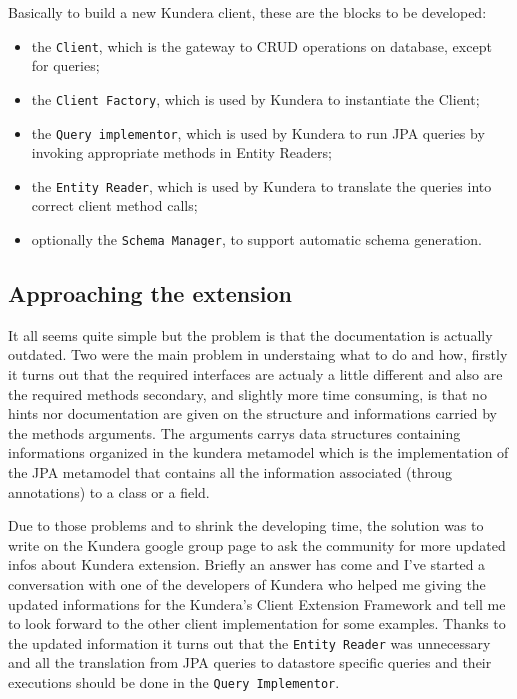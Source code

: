 \newparagraph Basically to build a new Kundera client, these are the blocks to be developed:
\begin{itemize}
\item the \texttt{Client}, which is the gateway to CRUD operations on database, except for queries;
\item the \texttt{Client Factory}, which is used by Kundera to instantiate the Client;
\item the \texttt{Query implementor}, which is used by Kundera to run JPA queries by invoking appropriate methods in Entity Readers;
\item the \texttt{Entity Reader}, which is used by Kundera to translate the queries into correct client
method calls;
\item optionally the \texttt{Schema Manager}, to support automatic schema generation.
\end{itemize}

\subsection{Approaching the extension}
It all seems quite simple but the problem is that the documentation is actually outdated. 
Two were the main problem in understaing what to do and how, firstly it turns out that the required interfaces are actualy a little different and also are the required methods
secondary, and slightly more time consuming, is that no hints nor documentation are given on the structure and informations carried by the methods arguments.
The arguments carrys data structures containing informations organized in the kundera metamodel which is the implementation of the JPA metamodel that contains all the information associated (throug annotations) to a class or a field.

\newparagraph Due to those problems and to shrink the developing time, the solution was to write on the Kundera google group page to ask the community for more updated infos about Kundera extension.
Briefly an answer has come and I've started a conversation with one of the developers of Kundera who helped me giving the updated informations for the Kundera's Client Extension Framework and tell me to look forward to the other client implementation for some examples. 
Thanks to the updated information it turns out that the \texttt{Entity Reader} was unnecessary and all the translation from JPA queries to datastore specific queries and their executions should be done in the \texttt{Query Implementor}.  

